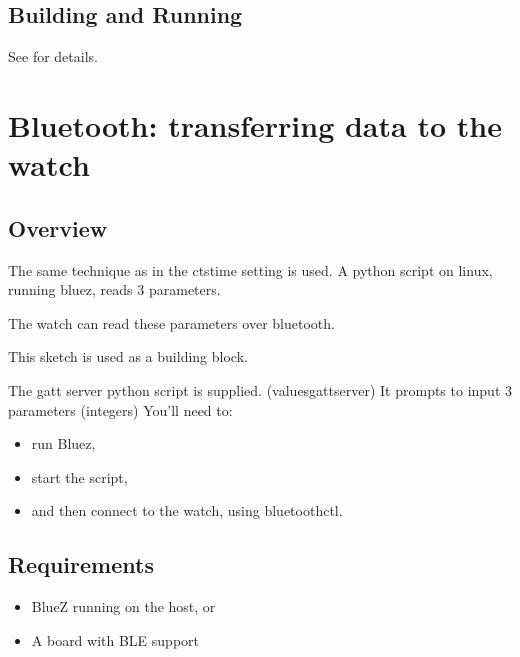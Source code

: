 \documentclass[letterpaper,10pt,english]{sphinxmanual}
\begin{document}
\subsection{Building and Running}
\label{\detokenize{samples/samplesbluetoothperipheral-notificationREADME:building-and-running}}
See  for details.


\section{Bluetooth: transferring data to the watch}
\label{\detokenize{samples/samplesbluetoothperipheralREADME:bluetooth-transferring-data-to-the-watch}}\label{\detokenize{samples/samplesbluetoothperipheralREADME:ble-peripheral}}\label{\detokenize{samples/samplesbluetoothperipheralREADME::doc}}

\subsection{Overview}
\label{\detokenize{samples/samplesbluetoothperipheralREADME:overview}}
The same technique as in the cts\sphinxhyphen{}time setting is used.
A python script on linux, running bluez, reads 3 parameters.

The watch can read these parameters over bluetooth.

This sketch is used as a building block.

The gatt server python script is supplied. (values\sphinxhyphen{}gatt\sphinxhyphen{}server)
It prompts to input 3 parameters (integers)
You’ll need to:
\begin{itemize}
\item {} 
run Bluez,

\item {} 
start the script,

\item {} 
and then connect to the watch, using bluetoothctl.

\end{itemize}


\subsection{Requirements}
\label{\detokenize{samples/samplesbluetoothperipheralREADME:requirements}}\begin{itemize}
\item {} 
BlueZ running on the host, or

\item {} 
A board with BLE support

\end{itemize}
\end{document}

